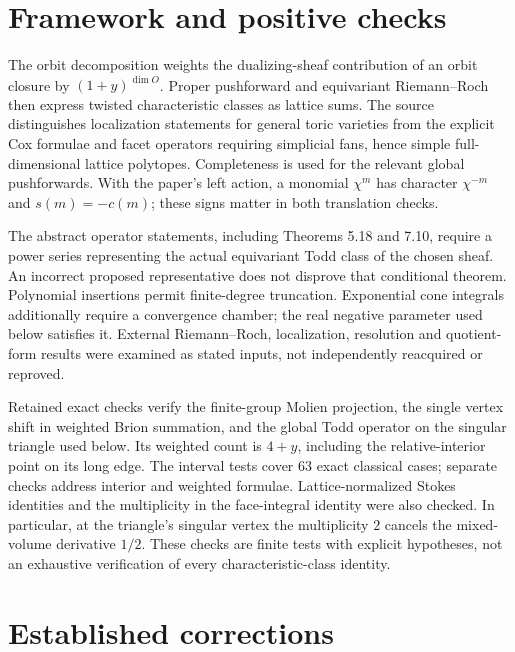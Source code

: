 \documentclass[10pt]{article}
\begin{document}
\section*{Framework and positive checks}
The orbit decomposition weights the dualizing-sheaf contribution of an orbit closure by \((1+y)^{\dim O}\). Proper pushforward and equivariant Riemann–Roch then express twisted characteristic classes as lattice sums. The source distinguishes localization statements for general toric varieties from the explicit Cox formulae and facet operators requiring simplicial fans, hence simple full-dimensional lattice polytopes. Completeness is used for the relevant global pushforwards. With the paper’s left action, a monomial \(\chi^m\) has character \(\chi^{-m}\) and \(s(m)=-c(m)\); these signs matter in both translation checks.\par
The abstract operator statements, including Theorems 5.18 and 7.10, require a power series representing the actual equivariant Todd class of the chosen sheaf. An incorrect proposed representative does not disprove that conditional theorem. Polynomial insertions permit finite-degree truncation. Exponential cone integrals additionally require a convergence chamber; the real negative parameter used below satisfies it. External Riemann–Roch, localization, resolution and quotient-form results were examined as stated inputs, not independently reacquired or reproved.\par
Retained exact checks verify the finite-group Molien projection, the single vertex shift in weighted Brion summation, and the global Todd operator on the singular triangle used below. Its weighted count is \(4+y\), including the relative-interior point on its long edge. The interval tests cover 63 exact classical cases; separate checks address interior and weighted formulae. Lattice-normalized Stokes identities and the multiplicity in the face-integral identity were also checked. In particular, at the triangle’s singular vertex the multiplicity \(2\) cancels the mixed-volume derivative \(1/2\). These checks are finite tests with explicit hypotheses, not an exhaustive verification of every characteristic-class identity.\par
\section*{Established corrections}
\end{document}
